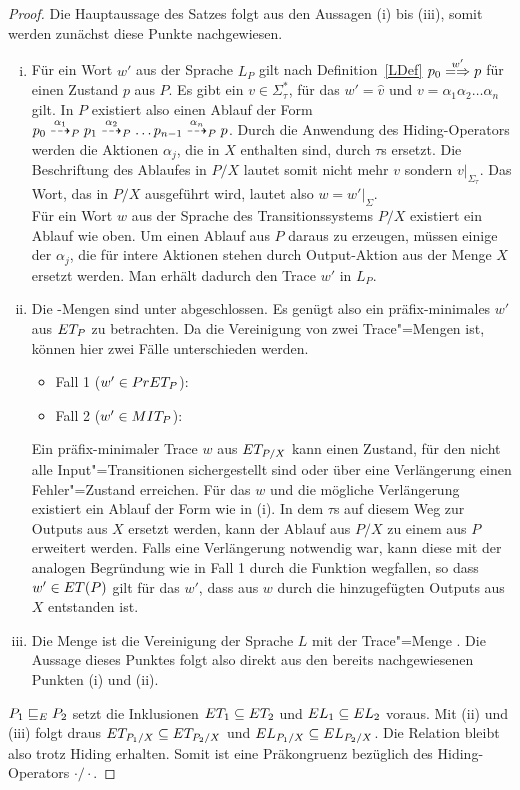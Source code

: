 \begin{proof}
  Die Hauptaussage des Satzes folgt aus den Aussagen (i) bis (iii), somit
  werden zunächst diese Punkte nachgewiesen.
  \begin{enumerate}[(i)]
    \item Für ein Wort $w'$ aus der Sprache $L_P$ gilt nach
      Definition~\ref{LDef} $p_0 \weakmay[w'] p$ für einen Zustand $p$ aus $P$.
      Es gibt ein $v\in \Sigma_{\tau} ^*$, für das $w' = \hat{v}$ und $v =
      \alpha _1\alpha _2\dots \alpha _n$ gilt. In $P$ existiert also einen
      Ablauf der Form $p_0 \may[\alpha _1]_P p_1 \may[\alpha _2]_P \dots
      p_{n-1} \may[\alpha _n]_P p$. Durch die Anwendung des Hiding-Operators
      werden die Aktionen $\alpha _j$, die in $X$ enthalten sind, durch $\tau$s
      ersetzt. Die Beschriftung des Ablaufes in $P/X$ lautet somit nicht mehr
      $v$ sondern $v|_{\Sigma _{\tau}}$. Das Wort, das in $P/X$ ausgeführt
      wird, lautet also $w=w'|_{\Sigma}$.\\
      Für ein Wort $w$ aus der Sprache des Transitionssystems $P/X$ existiert
      ein Ablauf wie oben. Um einen Ablauf aus $P$ daraus zu erzeugen, müssen
      einige der $\alpha _j$, die für intere Aktionen stehen durch
      Output-Aktion aus der Menge $X$ ersetzt werden. Man erhält dadurch den
      Trace $w'$ in $L_P$.
    \item Die \ET{}-Mengen sind unter \cont{} abgeschlossen. Es genügt also ein
      präfix-minimales $w'$ aus $ET _{P}$ zu betrachten. Da \ET{} die
      Vereinigung von zwei Trace"=Mengen ist, können hier zwei Fälle
      unterschieden werden.
      \begin{itemize}
        \item Fall 1 ($w'\in PrET _P$): 
        \item Fall 2 ($w'\in MIT _P$): 
      \end{itemize}
      Ein präfix-minimaler Trace $w$ aus $ET _{P/X}$ kann einen Zustand, für
      den nicht alle Input"=Transitionen sichergestellt sind oder über eine
      Verlängerung einen Fehler"=Zustand erreichen. Für das $w$ und die
      mögliche Verlängerung existiert ein Ablauf der Form wie in (i). In dem
      $\tau$s auf diesem Weg zur Outputs aus $X$ ersetzt werden, kann der
      Ablauf aus $P/X$ zu einem aus $P$ erweitert werden. Falls eine
      Verlängerung notwendig war, kann diese mit der analogen Begründung wie in
      Fall 1 durch die Funktion \prune{} wegfallen, so dass $w'\in ET (P)$ gilt
      für das $w'$, dass aus $w$ durch die hinzugefügten Outputs aus $X$
      entstanden ist.
    \item Die Menge \EL{} ist die Vereinigung der Sprache $L$ mit der
      Trace"=Menge \ET{}. Die Aussage dieses Punktes folgt also direkt aus den
      bereits nachgewiesenen Punkten (i) und (ii).
  \end{enumerate}
  $P_1 \sqsubseteq  _E P_2$ setzt die Inklusionen $ET _1\subseteq ET _2$ und $EL
  _1\subseteq EL _2$ voraus. Mit (ii) und (iii) folgt draus $ET _{P_1/X}
  \subseteq ET _{P_2/X}$ und $EL _{P_1/X} \subseteq EL _{P_2/X}$. Die Relation
  \ERel{} bleibt also trotz Hiding erhalten. Somit ist \ERel{} eine
  Präkongruenz bezüglich des Hiding-Operators $\cdot /\cdot$.
\end{proof}
